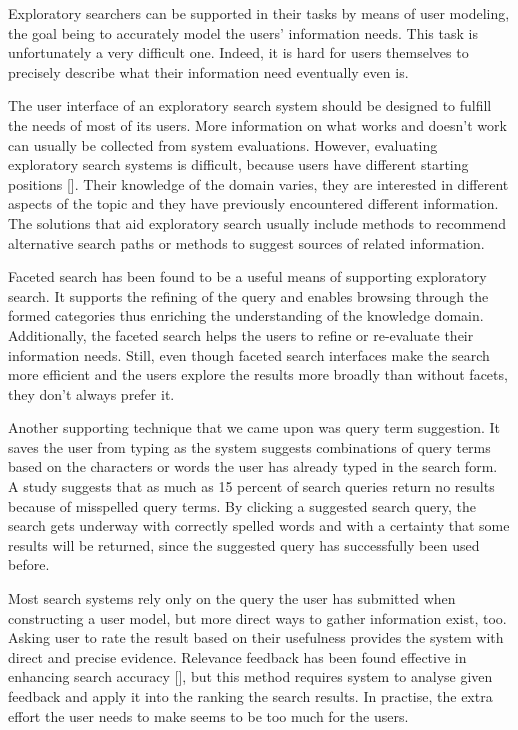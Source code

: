 \documentclass{sigchi}
\begin{document}
Exploratory searchers can be supported in their tasks by means of user modeling, the goal being to accurately model the users' information needs. This task is unfortunately a very difficult one. Indeed, it is hard for users themselves to precisely describe what their information need eventually even is. 

The user interface of an exploratory search system should be designed to fulfill the needs of most of its users. 
More information on what works and doesn't work can usually be collected from system evaluations.
However, evaluating exploratory search systems is difficult, because users have different starting positions [].
Their knowledge of the domain varies, they are interested in different aspects of the topic and they have previously encountered different information.
The solutions that aid exploratory search usually include methods to recommend alternative search paths or methods to suggest sources of related information. 

Faceted search has been found to be a useful means of supporting exploratory search. It supports the refining of the query and enables browsing through the formed categories thus enriching the understanding of the knowledge domain. Additionally, the faceted search helps the users to refine or re-evaluate their information needs. Still, even though faceted search interfaces make the search more efficient and the users explore the results more broadly than without facets, they don't always prefer it. 

Another supporting technique that we came upon was query term suggestion. It saves the user from typing as the system suggests combinations of query terms based on the characters or words the user has already typed in the search form. A study suggests that as much as 15 percent of search queries return no results because of misspelled query terms. By clicking a suggested search query, the search gets underway with correctly spelled words and with a certainty that some results will be returned, since the suggested query has successfully been used before.

Most search systems rely only on the query the user has submitted when constructing a user model, but more direct ways to gather information exist, too. Asking user to rate the result based on their usefulness provides the system with direct and precise evidence. Relevance feedback has been found effective in enhancing search accuracy [], but this method requires system to analyse given feedback and apply it into the ranking the search results. In practise, the extra effort the user needs to make seems to be too much for the users.
\end{document}
